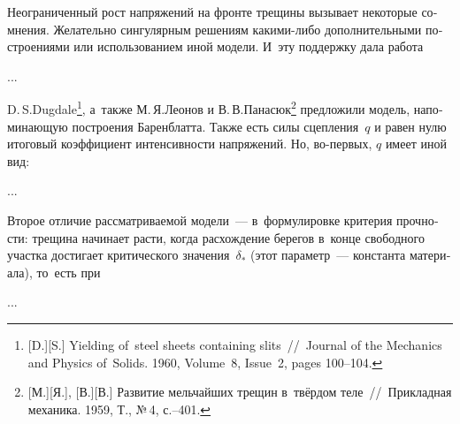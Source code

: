


\begin{otherlanguage}{russian}

Неограниченный рост напряжений на фронте трещины вызывает некоторые сомнения. Желательно  сингулярным решениям какими\hbox{-}либо дополнительными построениями или использованием иной модели. И~эту поддержку дала работа

...



\end{otherlanguage}



\begin{otherlanguage}{russian}

D.\,S.\;Dugdale\footnote{[D.][S.] Yielding of~steel sheets containing slits~//~Journal of the Mechanics and Physics of~Solids. 1960, Volume~8, Issue~2, pages 100\hbox{--}104.
}\hspace{-0.4ex}, а~также М.\,Я.\;Леонов и В.\,В.\;Панасюк\footnote{[М.][Я.], [В.][В.] Развитие мельчайших трещин в~твёрдом теле~//~Прикладная механика. 1959, Т., №\,4, с.\hbox{--}401.} предложили модель, напоминающую построения Баренблатта. Также есть силы сцепления~$q$ и равен нулю итоговый коэффициент интенсивности напряжений. Но, во\hbox{-}первых, $q$ имеет иной вид:

...

Второе отличие рассматриваемой модели~--- в~формулировке критерия прочности: трещина начинает расти, когда расхождение берегов в~конце свободного участка достигает критического значения~$\delta_{*}$ (этот параметр~--- константа материала), то~есть при

...



\end{otherlanguage}

